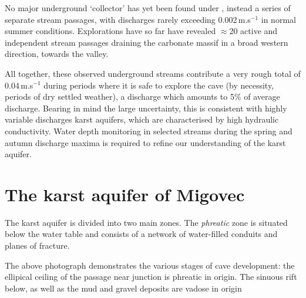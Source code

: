 No major underground ‘collector’ has yet been found under , instead a series of separate stream passages, with discharges rarely exceeding 0.002\,m.s$^{-1}$ in normal summer conditions. 
Explorations have so far have revealed $\approx$20 active and independent stream passages draining the carbonate massif in a broad western direction, towards the  valley. 

All together, these observed underground streams contribute a very rough total of 0.04\,m.s$^{-1}$ during periods where it is safe to explore the cave (by necessity, periods of dry settled weather), a discharge which amounts to 5\% of average discharge. 
Bearing in mind the large uncertainty, this is consistent with highly variable discharges karst aquifers, which are characterised by high hydraulic conductivity.
Water depth monitoring in selected streams during the spring and autumn discharge maxima is required to refine our understanding of the  karst aquifer.


\section{The karst aquifer of Migovec} 
The karst aquifer is divided into two main zones. The \emph{phreatic} zone is situated below the water table and consists of a network of water-filled conduits and planes of fracture. 

\begin{marginfigure}
\caption{The above photograph demonstrates the various stages of cave development: the ellipical ceiling of the passage near  junction is phreatic in origin. The sinuous rift below, as well as the mud and gravel deposits are vadose in origin }
\label{fig:dachstein}
\end{marginfigure}
 
